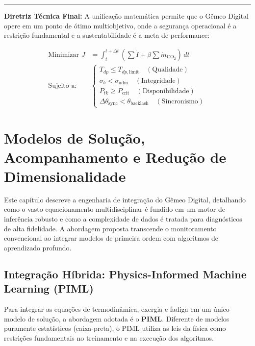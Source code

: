 \documentclass[12pt,a4paper]{article}
\numberwithin{equation}{section}
\numberwithin{table}{section}
\numberwithin{figure}{section}
\begin{document}
\vspace{1em}
\hrule
\vspace{1em}

\textbf{Diretriz Técnica Final:} A unificação matemática permite que o Gêmeo Digital opere em um ponto de ótimo multiobjetivo, onde a segurança operacional é a restrição fundamental e a sustentabilidade é a meta de performance:

\begin{equation}\label{eq:s18-6}
\begin{aligned}
	\text{Minimizar } J &= \int_{t}^{t+\Delta t} \left( \sum \dot{I} + \beta \sum \dot{m}_{\text{CO}_2} \right) \, dt \\[10pt]
	\text{Sujeito a: } & \begin{cases} T_{dp} \le T_{dp,\text{limit}} \quad (\text{Qualidade}) \\ \sigma_{b} < \sigma_{\text{adm}} \quad (\text{Integridade}) \\ P_{tk} \ge P_{\text{crit}} \quad (\text{Disponibilidade}) \\ \Delta \theta_{\text{sync}} < \theta_{\text{backlash}} \quad (\text{Sincronismo}) \end{cases}
\end{aligned}
\end{equation}



\section{Modelos de Solução, Acompanhamento e Redução de Dimensionalidade}

Este capítulo descreve a engenharia de integração do Gêmeo Digital, detalhando como o vasto equacionamento multidisciplinar é fundido em um motor de inferência robusto e como a complexidade de dados é tratada para diagnósticos de alta fidelidade. A abordagem proposta transcende o monitoramento convencional ao integrar modelos de primeira ordem com algoritmos de aprendizado profundo.

\subsection{Integração Híbrida: Physics-Informed Machine Learning (PIML)}

Para integrar as equações de termodinâmica, exergia e fadiga em um único modelo de solução, a abordagem adotada é o \textbf{PIML}. Diferente de modelos puramente estatísticos (caixa-preta), o PIML utiliza as leis da física como restrições fundamentais no treinamento e na execução dos algoritmos.
\end{document}
